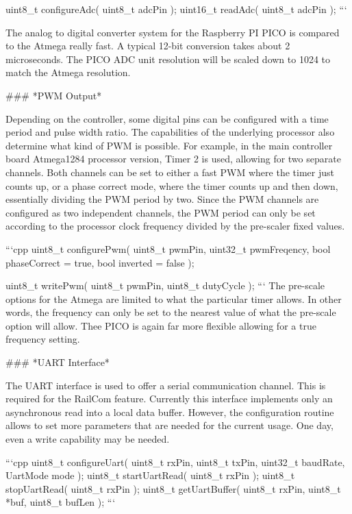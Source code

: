    uint8_t       configureAdc( uint8_t adcPin );
   uint16_t      readAdc( uint8_t adcPin );
```

The analog to digital converter system for the Raspberry PI PICO is compared to the Atmega really fast. A typical 12-bit conversion takes about 2 microseconds. The PICO ADC unit resolution will be scaled down to 1024 to match the Atmega resolution.

### *PWM Output*

Depending on the controller, some digital pins can be configured with a time period and pulse width ratio. The capabilities of the underlying processor also determine what kind of PWM is possible. For example, in the main controller board Atmega1284 processor version, Timer 2 is used, allowing for two separate channels. Both channels can be set to either a fast PWM where the timer just counts up, or a phase correct mode, where the timer counts up and then down, essentially dividing the PWM period by two. Since the PWM channels are configured as two independent channels, the PWM period can only be set according to the processor clock frequency divided by the pre-scaler fixed values.

```cpp
   uint8_t       configurePwm( uint8_t   pwmPin,
                               uint32_t  pwmFreqency,
                               bool      phaseCorrect  = true,
                               bool      inverted      = false
                               );

   uint8_t       writePwm( uint8_t pwmPin, uint8_t dutyCycle );
```
The pre-scale options for the Atmega are limited to what the particular timer allows. In other words, the frequency can only be set to the nearest value of what the pre-scale option will allow. Thee PICO is again far more flexible allowing for a true frequency setting.

### *UART Interface*

The UART interface is used to offer a serial communication channel. This is required for the RailCom feature. Currently this interface implements only an asynchronous read into a local data buffer. However, the configuration routine allows to set more parameters that are needed for the current usage. One day, even a write capability may be needed.

```cpp
   uint8_t       configureUart( uint8_t rxPin, uint8_t txPin, uint32_t baudRate, UartMode mode );
   uint8_t       startUartRead( uint8_t rxPin );
   uint8_t       stopUartRead( uint8_t rxPin );
   uint8_t       getUartBuffer( uint8_t rxPin, uint8_t *buf, uint8_t bufLen );
```

